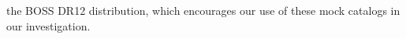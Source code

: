                                                                                                                                                                 the BOSS DR12 distribution, which encourages our use of these mock 
                                                                                                                                                                catalogs in our investigation.  
